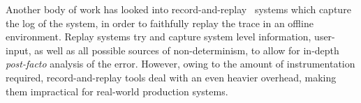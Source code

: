 Another body of work has looked into record-and-replay~\cite{odr,revirt,laadan2010transparent,geels2007friday} systems which capture the log of the system, in order to faithfully replay the trace in an offline environment.
Replay systems try and capture system level information, user-input, as well as all possible sources of non-determinism, to allow for in-depth \textit{post-facto} analysis of the error.
However, owing to the amount of instrumentation required, record-and-replay tools deal with an even heavier overhead, making them impractical for real-world production systems.




